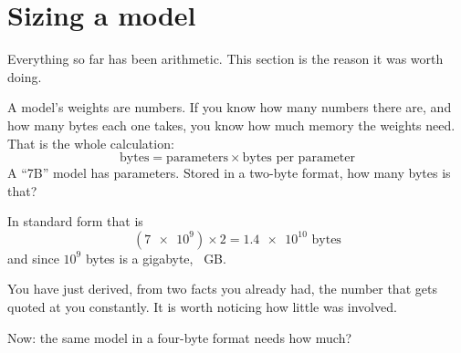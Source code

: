 
\section{Sizing a model}
\label{sec:F01-sizing}

\begin{fr}
Everything so far has been arithmetic. This section is the reason it was worth
doing.

A model's weights are numbers. If you know how many numbers there are, and how
many bytes each one takes, you know how much memory the weights need. That is
the whole calculation:
\[ \text{bytes} = \text{parameters} \times \text{bytes per parameter} \]
A \enquote{7B} model has  parameters. Stored in a two-byte
format, how many bytes is that?
\nextframe
\end{fr}

\begin{fr}
In standard form that is
\[ (\num{7e9}) \times 2 = \num{1.4e10} \text{ bytes} \]
and since $10^{9}$ bytes is a gigabyte, ~GB.

You have just derived, from two facts you already had, the number that gets
quoted at you constantly. It is worth noticing how little was involved.

Now: the same model in a four-byte format needs how much?
\nextframe
\end{fr}

